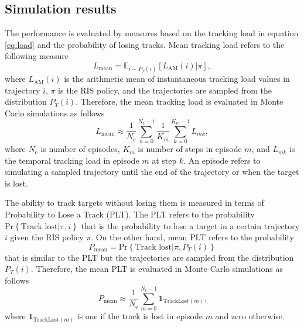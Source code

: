 \documentclass[english, 12pt, a4paper, elec, utf8, a-1b, online]{aaltothesis}
\numberwithin{equation}{section}
\newcommand{\Ne}{N_\text{e}}
\renewcommand{\vec}[1]{\mathbf{#1}}
\renewcommand{\Pr}[1]{\text{Pr}\left\{ #1 \right\}}
\begin{document}
\subsection{Simulation results}\label{sec:ri_sim}

The performance is evaluated by measures based on the tracking load in equation \eqref{eq:load} and the probability of losing tracks. 
Mean tracking load refers to the following measure
\begin{equation} 
    L_\text{mean} = \mathbb{E}_{i \sim P_T(i)} \left[ L_\text{AM}(i) | \pi \right],
\end{equation}
where $L_\text{AM}(i)$ is the arithmetic mean of instantaneous tracking load values in trajectory $i$,  $\pi$ is the RIS policy, and the trajectories are sampled from the distribution $P_T(i)$.
Therefore, the mean tracking load is evaluated in Monte Carlo simulations as follows
\begin{equation}\label{eq:criterion_load}
    L_\text{mean} \approx \frac{1}{\Ne} \sum_{n=0}^{\Ne-1} \frac{1}{K_m}\sum_{k=0}^{K_m-1} L_{mk},
\end{equation}
where $\Ne$ is number of episodes, $K_m$ is number of steps in episode $m$, and $L_{mk}$ is the temporal tracking load in episode $m$ at step $k$.
An episode refers to simulating a sampled trajectory until the end of the trajectory or when the target is lost.

The ability to track targets without losing them is measured in terms of Probability to Lose a Track (PLT).
The PLT refers to the probability $\Pr{\text{Track lost}|\pi, i}$ that is the probability to lose a target in a certain trajectory $i$ given the RIS policy $\pi$.
On the other hand, mean PLT refers to the probability
\begin{equation}
    P_\text{mean} = \Pr{\text{Track lost}|\pi, P_T(i)}
\end{equation} 
that is similar to the PLT but the trajectories are sampled from the distribution $P_T(i)$.
Therefore, the mean PLT is evaluated in Monte Carlo simulations as follows
\begin{equation}\label{eq:criterion_lost}
\   P_\text{mean} \approx \frac{1}{\Ne} \sum_{m=0}^{\Ne-1} \vec{1}_{\text{TrackLost}(m)},
\end{equation}
where $\vec{1}_{\text{TrackLost}(m)}$ is one if the track is lost in episode $m$ and zero otherwise.
\end{document}
